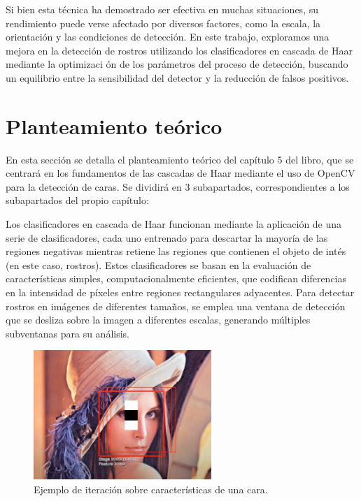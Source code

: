 \documentclass[a4paper]{article}
\begin{document}
Si bien esta
técnica ha demostrado ser efectiva en muchas situaciones, su rendimiento puede
verse afectado por diversos factores, como la escala, la orientación y las condiciones
de detección. En este trabajo, exploramos una mejora en la detección
de rostros utilizando los clasificadores en cascada de Haar mediante la optimizaci
ón de los parámetros del proceso de detección, buscando un equilibrio entre
la sensibilidad del detector y la reducción de falsos positivos.

\section{Planteamiento teórico}

En esta sección se detalla el planteamiento teórico del capítulo 5 del libro\cite{1}, que se centrará en los fundamentos de las cascadas de Haar mediante el uso de OpenCV para la detección de caras. Se dividirá en 3 subapartados, correspondientes a los subapartados del propio capítulo:

Los clasificadores en cascada de Haar funcionan mediante la aplicación de
una serie de clasificadores, cada uno entrenado para descartar la mayoría de
las regiones negativas mientras retiene las regiones que contienen el objeto de
intés (en este caso, rostros). Estos clasificadores se basan en la evaluación
de características simples, computacionalmente eficientes, que codifican diferencias
en la intensidad de píxeles entre regiones rectangulares adyacentes. Para
detectar rostros en imágenes de diferentes tamaños, se emplea una ventana de
detección que se desliza sobre la imagen a diferentes escalas, generando múltiples
subventanas para su análisis.
\begin{figure}[!h]
    \centering
    \includegraphics[width=0.6\textwidth]{../img/haar_iter.png}
    \caption{Ejemplo de iteración sobre características de una cara.\cite{3}}
\end{figure}
\end{document}
